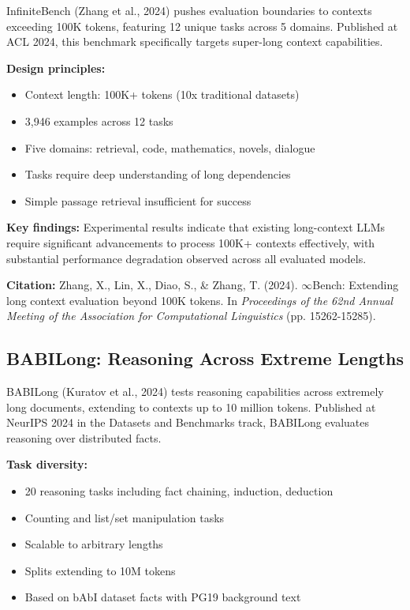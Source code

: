 \documentclass[11pt]{article}
\begin{document}
InfiniteBench (Zhang et al., 2024) pushes evaluation boundaries to contexts exceeding 100K tokens, featuring 12 unique tasks across 5 domains. Published at ACL 2024, this benchmark specifically targets super-long context capabilities.

\textbf{Design principles:}
\begin{itemize}[leftmargin=*]
    \item Context length: 100K+ tokens (10x traditional datasets)
    \item 3,946 examples across 12 tasks
    \item Five domains: retrieval, code, mathematics, novels, dialogue
    \item Tasks require deep understanding of long dependencies
    \item Simple passage retrieval insufficient for success
\end{itemize}

\textbf{Key findings:}
Experimental results indicate that existing long-context LLMs require significant advancements to process 100K+ contexts effectively, with substantial performance degradation observed across all evaluated models.

\textbf{Citation:} Zhang, X., Lin, X., Diao, S., \& Zhang, T. (2024). $\infty$Bench: Extending long context evaluation beyond 100K tokens. In \textit{Proceedings of the 62nd Annual Meeting of the Association for Computational Linguistics} (pp. 15262-15285).

\subsection{BABILong: Reasoning Across Extreme Lengths}

BABILong (Kuratov et al., 2024) tests reasoning capabilities across extremely long documents, extending to contexts up to 10 million tokens. Published at NeurIPS 2024 in the Datasets and Benchmarks track, BABILong evaluates reasoning over distributed facts.

\textbf{Task diversity:}
\begin{itemize}[leftmargin=*]
    \item 20 reasoning tasks including fact chaining, induction, deduction
    \item Counting and list/set manipulation tasks
    \item Scalable to arbitrary lengths
    \item Splits extending to 10M tokens
    \item Based on bAbI dataset facts with PG19 background text
\end{itemize}
\end{document}
